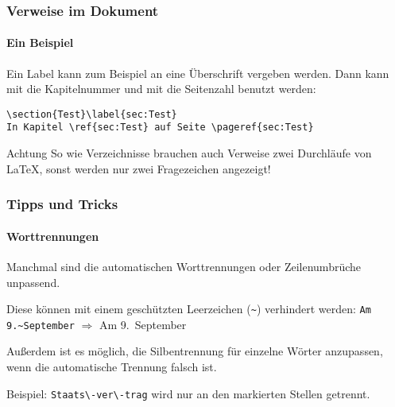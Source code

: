 \begin{frame}[fragile]
    \frametitle{Verweise im Dokument}
    \framesubtitle{Ein Beispiel}
    Ein Label kann zum Beispiel an eine Überschrift vergeben werden. Dann kann mit  die Kapitelnummer und mit  die Seitenzahl benutzt werden:
    \bigskip
    \pause

    \begin{verbatim}
\section{Test}\label{sec:Test}
In Kapitel \ref{sec:Test} auf Seite \pageref{sec:Test}
    \end{verbatim}
    
    \pause
    \begin{alertblock}{Achtung}
        So wie Verzeichnisse brauchen auch Verweise zwei Durchläufe von \LaTeX{}, sonst werden nur zwei Fragezeichen angezeigt!
    \end{alertblock}
\end{frame}


\begin{frame}[fragile]
    \frametitle{Tipps und Tricks}
    \framesubtitle{Worttrennungen}
    Manchmal sind die automatischen Worttrennungen oder Zeilenumbrüche unpassend.
    \medskip\pause
    
    Diese können mit einem geschützten Leerzeichen (\texttt{\~{}}) verhindert werden: \verb+Am 9.~September+ $\Rightarrow$ Am 9.~September
    
    \medskip\pause
    Außerdem ist es möglich, die Silbentrennung für einzelne Wörter anzupassen, wenn die automatische Trennung falsch ist.
    \smallskip
    
    Beispiel: \verb+Staats\-ver\-trag+ wird nur an den markierten Stellen getrennt.
\end{frame}
